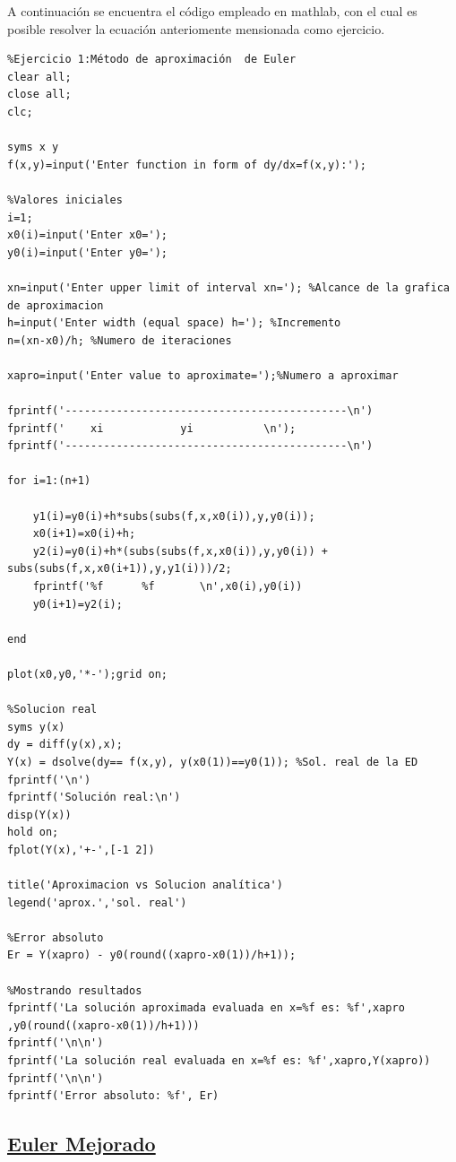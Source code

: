 \documentclass[12 pt,letterpaper]{article}
\begin{document}
A continuación se encuentra el código empleado en mathlab, con el cual es posible resolver la ecuación anteriomente mensionada como ejercicio.
\begin{lstlisting}
%Ejercicio 1:Método de aproximación  de Euler
clear all;
close all;
clc;

syms x y
f(x,y)=input('Enter function in form of dy/dx=f(x,y):');

%Valores iniciales
i=1;
x0(i)=input('Enter x0=');
y0(i)=input('Enter y0=');

xn=input('Enter upper limit of interval xn='); %Alcance de la grafica de aproximacion 
h=input('Enter width (equal space) h='); %Incremento
n=(xn-x0)/h; %Numero de iteraciones

xapro=input('Enter value to aproximate=');%Numero a aproximar

fprintf('--------------------------------------------\n')
fprintf('    xi            yi           \n');
fprintf('--------------------------------------------\n')

for i=1:(n+1)
    
    y1(i)=y0(i)+h*subs(subs(f,x,x0(i)),y,y0(i));
    x0(i+1)=x0(i)+h;
    y2(i)=y0(i)+h*(subs(subs(f,x,x0(i)),y,y0(i)) + subs(subs(f,x,x0(i+1)),y,y1(i)))/2;
    fprintf('%f      %f       \n',x0(i),y0(i))
    y0(i+1)=y2(i);
    
end

plot(x0,y0,'*-');grid on;

%Solucion real
syms y(x)
dy = diff(y(x),x);
Y(x) = dsolve(dy== f(x,y), y(x0(1))==y0(1)); %Sol. real de la ED
fprintf('\n')
fprintf('Solución real:\n')
disp(Y(x))
hold on;
fplot(Y(x),'+-',[-1 2])

title('Aproximacion vs Solucion analítica')
legend('aprox.','sol. real')

%Error absoluto
Er = Y(xapro) - y0(round((xapro-x0(1))/h+1));

%Mostrando resultados
fprintf('La solución aproximada evaluada en x=%f es: %f',xapro ,y0(round((xapro-x0(1))/h+1)))
fprintf('\n\n')
fprintf('La solución real evaluada en x=%f es: %f',xapro,Y(xapro))
fprintf('\n\n')
fprintf('Error absoluto: %f', Er)
	\end{lstlisting}
	
	\flushleft\subsection{\underline{Euler Mejorado}}\vspace{0.5cm}
	
\end{document}
